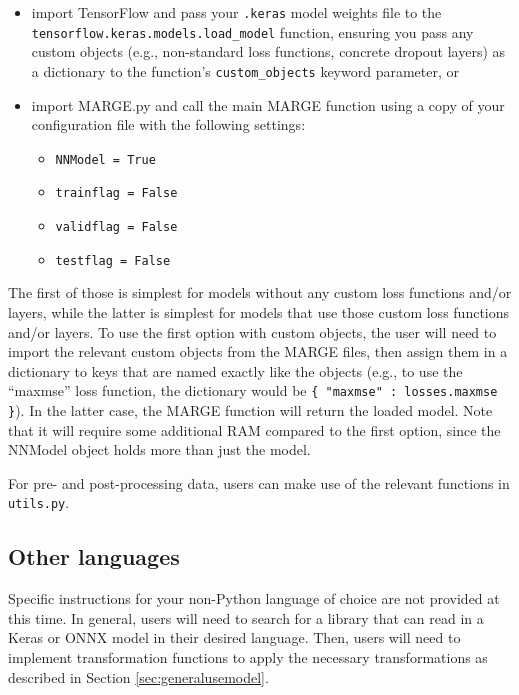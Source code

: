 \documentclass[letterpaper, 12pt]{article}
\begin{document}
\begin{itemize}
	\item import TensorFlow and pass your \texttt{.keras} model weights file to 
	    the \texttt{tensorflow.keras.models.load\_model} function, ensuring you 
	    pass any custom objects (e.g., non-standard loss functions, concrete 
	    dropout layers) as a dictionary to the function's 
	    \texttt{custom\_objects} keyword parameter, or
	\item import MARGE.py and call the main MARGE function using a copy of your 
	    configuration file with the following settings:
	    \begin{itemize}
	    	\item \texttt{NNModel = True}
	    	\item \texttt{trainflag = False}
	    	\item \texttt{validflag = False}
	    	\item \texttt{testflag = False}
	    \end{itemize}
\end{itemize}

\noindent The first of those is simplest for models without any custom loss 
functions and/or layers, while the latter is simplest for models that use those 
custom loss functions and/or layers.  To use the first option with custom 
objects, the user will need to import the relevant custom objects from the 
MARGE files, then assign them in a dictionary to keys that are named exactly 
like the objects (e.g., to use the ``maxmse'' loss function, the dictionary would 
be \texttt{\{ "maxmse" : losses.maxmse \}}).  In the latter case, the MARGE 
function will return the loaded model.  Note that it will require some 
additional RAM compared to the first option, since the NNModel object holds 
more than just the model. \newline

\noindent For pre- and post-processing data, users can make use of the relevant 
functions in \texttt{utils.py}.  

\subsection{Other languages}

Specific instructions for your non-Python language of choice are not provided 
at this time.  In general, users will need to search for a library that can read 
in a Keras or ONNX model in their desired language.  Then, users will need to 
implement transformation functions to apply the necessary transformations as 
described in Section \ref{sec:generalusemodel}. \newline
\end{document}
